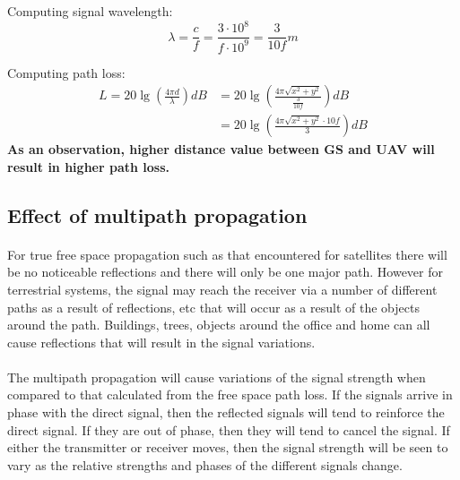 Computing signal wavelength:
\begin{equation}\label{eq:vel_freq_wavelen2}
	\lambda = \frac{c}{f} 
	        = \frac{3\cdot 10^{8}}{f\cdot 10^{9}}
	        = \frac{3}{10f}m
\end{equation}

Computing path loss:
\begin{align*}\label{eq:path_loses_calc}
	L = 20\lg\left (\frac{4\pi d}{\lambda} \right) dB 
	 &= 20\lg\left (\frac{4\pi \sqrt{x^2+y^2}}{\frac{3}{10f}} \right) dB\\ 
	 &= 20\lg\left (\frac{4\pi \sqrt{x^2+y^2}\cdot 10f}{ 3} \right) dB
\end{align*}
\noindent \textbf{As an observation, higher distance value between GS and UAV will result in higher path loss.}

\subsection*{Effect of multipath propagation}
\paragraph{}For true free space propagation such as that encountered for satellites there will be no noticeable reflections and there will only be one major path. However for terrestrial systems, the signal may reach the receiver via a number of different paths as a result of reflections, etc that will occur as a result of the objects around the path. Buildings, trees, objects around the office and home can all cause reflections that will result in the signal variations.

\paragraph{}The multipath propagation will cause variations of the signal strength when compared to that calculated from the free space path loss. If the signals arrive in phase with the direct signal, then the reflected signals will tend to reinforce the direct signal. If they are out of phase, then they will tend to cancel the signal. If either the transmitter or receiver moves, then the signal strength will be seen to vary as the relative strengths and phases of the different signals change.